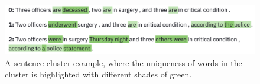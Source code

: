 \begin{figure}[!htb]
    \centering
    \includegraphics[width=\textwidth]{figures/words_uniqueness.png}
    \caption{A sentence cluster example, where the uniqueness of words in the cluster is highlighted with different shades of green.}
    \label{fig:words_uniqueness}
\end{figure}










